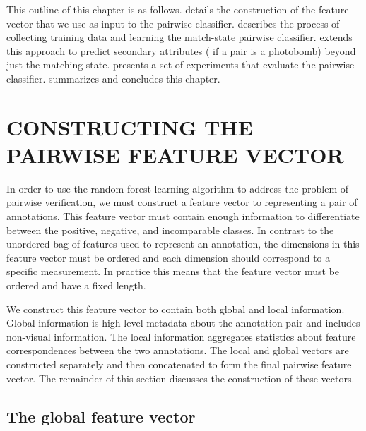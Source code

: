 This outline of this chapter is as follows.
 details the construction of the feature vector that we use as input to the pairwise
  classifier.
 describes the process of collecting training data and learning the match-state pairwise
  classifier.
 extends this approach to predict secondary attributes (\eg{} if a pair is a photobomb) beyond
  just the matching state.
 presents a set of experiments that evaluate the pairwise classifier.
 summarizes and concludes this chapter.


\section{CONSTRUCTING THE PAIRWISE FEATURE VECTOR}\label{sec:pairfeat}

In order to use the random forest learning algorithm to address the problem of pairwise verification, we must
  construct a feature vector to representing a pair of annotations.
This feature vector must contain enough information to differentiate between the positive, negative, and
  incomparable classes.
In contrast to the unordered bag-of-features used to represent an annotation, the dimensions in this feature
  vector must be ordered and each dimension should correspond to a specific measurement.
In practice this means that the feature vector must be ordered and have a fixed length.

We construct this feature vector to contain both global and local information.
Global information is high level metadata about the annotation pair and includes non-visual information.
The local information aggregates statistics about feature correspondences between the two annotations.
The local and global vectors are constructed separately and then concatenated to form the final pairwise feature
  vector.
The remainder of this section discusses the construction of these vectors.

\subsection{The global feature vector}

